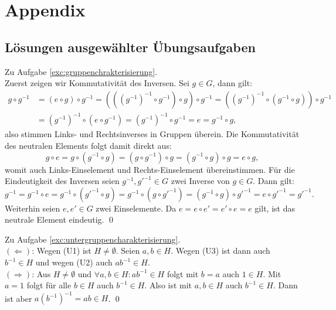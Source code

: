 \section{Appendix}
\label{sec:appendix}
\subsection{Lösungen ausgewählter Übungsaufgaben}
\label{subsec:solutions}
\begin{lösung} Zu Aufgabe \ref{exc:gruppenchrakterisierung}.\\
Zuerst zeigen wir Kommutativität des Inversen. Sei $g \in G$, dann gilt:
\begin{align}
g \circ g^{-1} &= (e \circ g) \circ g^{-1} = \left( \left( \left( g^{-1}\right)^{-1} \circ g^{-1} \right) \circ g \right) \circ g^{-1} = \left(  \left( g^{-1}\right)^{-1} \circ \left( g^{-1} \circ g \right)\right) \circ g^{-1}\\ 
&= \left( g^{-1}\right)^{-1} \circ \left( e  \circ g^{-1} \right) = \left( g^{-1}\right)^{-1} \circ g^{-1} = e = g^{-1} \circ g,
\end{align}
also stimmen Links- und Rechtsinverses in Gruppen überein.
Die Kommutativität des neutralen Elements folgt damit direkt aus:
\begin{equation}
g \circ e = g \circ (g^{-1} \circ g) = (g \circ g^{-1}) \circ g = (g^{-1} \circ g) \circ g = e \circ g,
\end{equation}
womit auch Links-Einselement und Rechts-Einselement übereinstimmen.
Für die Eindeutigkeit des Inversen seien $g^{-1}, g'^{-1} \in G$ zwei Inverse von $g \in G$. Dann gilt:
\begin{equation}
g^{-1} = g^{-1} \circ e = g^{-1} \circ (g'^{-1} \circ g) = g^{-1} \circ (g \circ g'^{-1}) = (g^{-1} \circ g) \circ g'^{-1} = e \circ g'^{-1} = g'^{-1}.
\end{equation}
Weiterhin seien $e,e' \in G$ zwei Einselemente. Da $e = e \circ e' = e' \circ e = e$ gilt, ist das neutrale Element eindeutig. \qed
\end{lösung}
\begin{lösung} Zu Aufgabe \ref{exc:untergruppencharakterisierung}.\\
$(\Leftarrow)$: Wegen (U1) ist $H \neq \emptyset$. Seien $a,b \in H$. Wegen (U3) ist dann auch $b^{-1} \in H$ und wegen (U2) auch $ab^{-1} \in H$.\\
$(\Rightarrow)$: Aus $H \neq \emptyset$ und $\forall a,b \in H: ab^{-1} \in H$ folgt mit $b=a$ auch $1 \in H$. Mit $a=1$ folgt für alle $b \in H$ auch $b^{-1} \in H$. Also ist mit $a,b \in H$ auch $b^{-1} \in H$. Dann ist aber $a(b^{-1})^{-1} = ab \in H$. \qed
\end{lösung}
